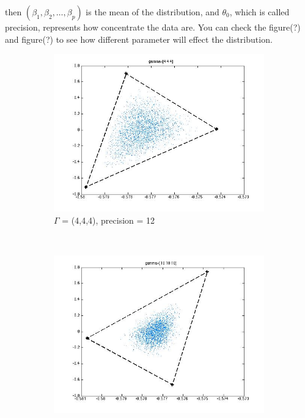 \documentclass[14pt]{book}
\begin{document}
then  $(\beta_1,\beta_2,\dots,\beta_p)$ is the mean of the distribution,
and $ \theta_0$, which is called precision, represents how concentrate the data are. You can check 
the figure(?) and figure(?) to see how different parameter will effect the distribution. 
\begin{figure}
        \centering
        \begin{subfigure}[b]{0.3\textwidth}
                \centering
                \includegraphics[width=\textwidth]{(4,4,4).jpg}
                \caption{$\Gamma$ = (4,4,4), precision = 12 }
                \label{fig:gull}
        \end{subfigure}%
        ~ %
        \begin{subfigure}[b]{0.3\textwidth}
                \centering
                \includegraphics[width=\textwidth]{(10,10,10).jpg}

\end{subfigure}
\end{figure}
\end{document}
